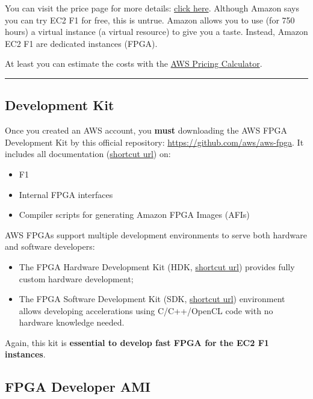 \documentclass[a4paper]{article}
\newcommand{\longline}{\noindent\rule{\textwidth}{0.4pt}}
\begin{document}
    \noindent
    You can visit the price page for more details: \href{https://aws.amazon.com/ec2/pricing/}{click here}. Although Amazon says you can try EC2 F1 for free, this is untrue. Amazon allows you to use (for 750 hours) a virtual instance (a virtual resource) to give you a taste. Instead, Amazon EC2 F1 are dedicated instances (FPGA).\newline

    \noindent
    At least you can estimate the costs with the \href{https://calculator.aws/#/createCalculator/ec2-enhancement}{AWS Pricing Calculator}.

    \longline

    \subsection{Development Kit}\label{sec: development kit}

    Once you created an AWS account, you \textbf{must} downloading the AWS FPGA Development Kit by this official repository: \url{https://github.com/aws/aws-fpga}. It includes all documentation (\href{https://github.com/aws/aws-fpga#documentation-overview}{shortcut url}) on:
    \begin{itemize}
        \item F1
        \item Internal FPGA interfaces
        \item Compiler scripts for generating Amazon FPGA Images (AFIs)
    \end{itemize}
    
    \noindent
    AWS FPGAs support multiple development environments to serve both hardware and software developers:
    \begin{itemize}
        \item The FPGA Hardware Development Kit (HDK, \href{https://github.com/aws/aws-fpga#hardware-development-kit-hdk}{shortcut url}) provides fully custom hardware development;

        \item The FPGA Software Development Kit (SDK, \href{https://github.com/aws/aws-fpga#runtime-tools-sdk}{shortcut url}) environment allows developing accelerations using C/C++/OpenCL code with no hardware knowledge needed.
    \end{itemize}
    Again, this kit is \textbf{essential to develop fast FPGA for the EC2 F1 instances}.\newpage

    \subsection{FPGA Developer AMI}\label{sec: FPGA Developer AMI}
\end{document}

